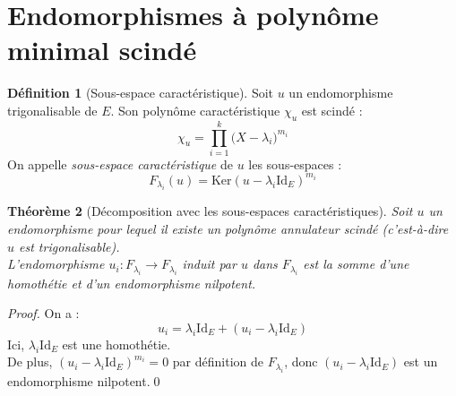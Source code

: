 \documentclass[11pt,a4paper]{report}
\newtheorem{theorem}{Théorème}[chapter]
\theoremstyle{definition}
\newtheorem{dfn}[theorem]{Définition}
\begin{document}
\section{Endomorphismes à polynôme minimal scindé} %
\label{sec:endomorphismes_polynome_minimal_scinde}
\begin{dfn}[Sous-espace caractéristique]
     Soit $u$ un endomorphisme trigonalisable de $E$. Son polynôme caractéristique $\chi_u$ est scindé : 
     \[
         \chi_u = \prod_{i=1}^k \big( X - \lambda_i \big)^{m_i}
     \]
     On appelle \emph{sous-espace caractéristique} de $u$ les sous-espaces : 
     \begin{equation}
     F_{\lambda_i}(u) = \mathrm{Ker} (u-\lambda_i \mathrm{Id}_E)^{m_i}
     \end{equation}
\end{dfn}
\begin{theorem}[Décomposition avec les sous-espaces caractéristiques]
     Soit $u$ un endomorphisme pour lequel il existe un polynôme annulateur scindé (c'est-à-dire $u$ est trigonalisable). \\
     L'endomorphisme $u_i : F_{\lambda_i} \to F_{\lambda_i}$ induit par $u$ dans $F_{\lambda_i}$ est la somme d'une homothétie et d'un endomorphisme nilpotent.
\end{theorem}
\begin{proof}
     On a :
     \[ u_i = \lambda_i \mathrm{Id}_E + (u_i - \lambda_i \mathrm{Id}_E) \]
     Ici, $\lambda_i \mathrm{Id}_E$ est une homothétie.\\
     De plus, $(u_i - \lambda_i \mathrm{Id}_E)^{m_i} = 0$ par définition de $F_{\lambda_i}$, donc $(u_i - \lambda_i \mathrm{Id}_E)$ est un endomorphisme nilpotent.\qed
\end{proof}


\end{document}
